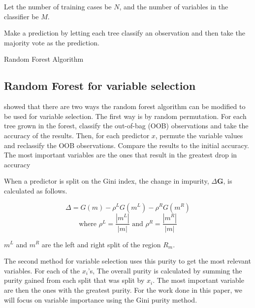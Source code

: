 \begin{algorithm}
Let the number of training cases be $N$, and the number of variables in the classifier be $M$.

Make a prediction by letting each tree classify an observation and then take the majority vote as the prediction.
\caption{Random Forest Algorithm}\label{algo: RandomForest}
\end{algorithm}

\subsection{Random Forest for variable selection}
\citet{Breiman01} showed that there are two ways the random forest algorithm can be modified to be used for variable selection. The first way is by random permutation. For each tree grown in the forest, classify the out-of-bag (OOB) observations and take the accuracy of the results. Then, for each predictor $x$, permute the variable values and reclassify the OOB observations. Compare the results to the initial accuracy. The most important variables are the ones that result in the greatest drop in accuracy

When a predictor is split on the Gini index, the change in impurity, $\Delta\textbf{G}$, is calculated as follows. 

\begin{equation}\label{eqn:Delta Function}
	\Delta=G(m)-\rho^L G(m^L)-\rho^R G(m^R) 
\end{equation}
\begin{equation}
	\text{where } \rho^L = \frac{|m^L|}{|m|} \text{ and } \rho^R = \frac{|m^R|}{|m|}
\end{equation}
	



$m^L$ and $m^R$ are the left and right split of the region $R_m$. 

The second method for variable selection uses this purity to get the most relevant variables. For each of the $x_i$'s, The overall purity is calculated by summing the purity gained from each split that was split by $x_i$. The most important variable are then the ones with the greatest purity. For the work done in this paper, we will focus on variable importance using the Gini purity method. 	

